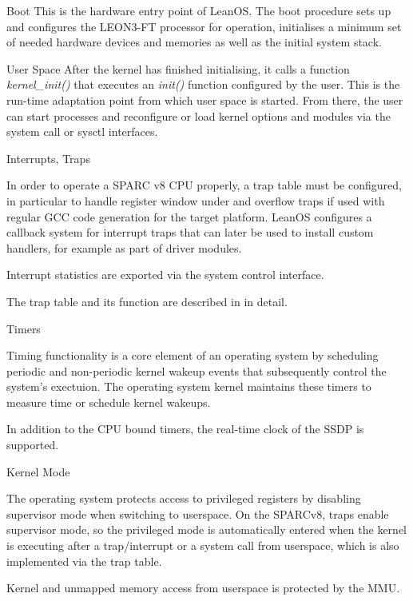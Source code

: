 %
{Boot}{%
This is the hardware entry point of LeanOS. The boot procedure sets up and
configures the \gls{LEON3-FT} processor for operation, initialises a minimum set of 
needed hardware devices and memories as well as the initial system stack.
}%
{}{}



{User Space}{%
After the kernel has finished initialising, it calls a function
\mbox{\emph{kernel\_init()}}
that executes an \emph{init()} function configured by the user. This is the
run-time adaptation point from which user space is started. From there, the user
can start processes and reconfigure or load kernel options and modules via the
system call or sysctl interfaces.
}%
{}{}



%
{Interrupts, Traps}
{In order to operate a \gls{SPARC} v8 \gls{CPU} properly, a trap table must be
configured, in particular to handle register window under and overflow traps if
used with regular \gls{GCC} code generation for the target platform.
LeanOS configures a callback system for interrupt traps that can later be used
to install custom handlers, for example as part of driver modules.\newline

Interrupt statistics are exported via the system control interface.
}%
{}%
{The trap table and its function are described in \cite{SPARCv8} in detail.}



%
{Timers}{%
Timing functionality is a core element of an operating system by scheduling
periodic and non-periodic kernel wakeup events that subsequently control the
system's exectuion. The operating system kernel maintains these timers to
measure time or schedule kernel wakeups.

In addition to the \gls{CPU} bound timers, the real-time clock of the \gls{SSDP}
is supported.
}%
{}{}


%
{Kernel Mode}{%
The operating system protects access to privileged registers by disabling
supervisor mode when switching to userspace. On the \gls{SPARC}v8, traps enable
supervisor mode, so the privileged mode is automatically entered when the kernel
is executing after a trap/interrupt or a system call from userspace, which is
also implemented via the trap table.\newline

Kernel and unmapped memory access from userspace is protected by the \gls{MMU}.
}%
{}{}


